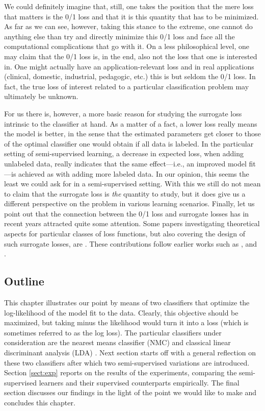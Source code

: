 \documentclass[twoside]{memoir}\usepackage[]{graphicx}\usepackage{xcolor}
\renewcommand{\cite}{\citep}
\begin{document}
We could definitely imagine that, still, one takes the position that the mere loss that matters is the 0/1 loss and that it is this quantity that has to be minimized.  As far as we can see, however, taking this stance to the extreme, one cannot do anything else than try and directly minimize this 0/1 loss and face all the computational complications that go with it.  On a less philosophical level, one may claim that the 0/1 loss is, in the end, also not the loss that one is interested in.  One might actually have an application-relevant loss and in real applications (clinical, domestic, industrial, pedagogic, etc.) this is but seldom the 0/1 loss.  In fact, the true loss of interest related to a particular classification problem may ultimately be unknown.

For us there is, however, a more basic reason for studying the surrogate loss intrinsic to the classifier at hand. As a matter of a fact, a lower loss really means the model is better, in the sense that the estimated parameters get closer to those of the optimal classifier one would obtain if all data is labeled.  In the particular setting of semi-supervised learning, a decrease in expected loss, when adding unlabeled data, really indicates that the same effect---i.e., an improved model fit---is achieved as with adding more labeled data.  In our opinion, this seems the least we could ask for in a semi-supervised setting.  With this we still do not mean to claim that the surrogate loss is \emph{the} quantity to study, but it does give us a different perspective on the problem in various learning scenarios.  Finally, let us point out that the connection between the 0/1 loss and surrogate losses has in recent years attracted quite some attention.  Some papers investigating theoretical aspects for particular classes of loss functions, but also covering the design of such surrogate losses, are \cite{Ben-David2012,masnadi2008design,Nguyen2009,Reid2009,reid2010composite,scott2011surrogate}. These contributions follow earlier works such as \cite{Bartlett2006}, and \cite{Zhang2004}.




\subsection{Outline}

This chapter illustrates our point by means of two classifiers that optimize the log-likelihood of the model fit to the data. Clearly, this objective should be maximized, but taking minus the likelihood would turn it into a loss (which is sometimes referred to as the log loss).  The particular classifiers under consideration are the nearest means classifier (NMC) \cite{duda72a} and classical linear discriminant analysis (LDA) \cite{rao1948utilization}.    Next section starts off with a general reflection on these two classifiers after which two semi-supervised variations are introduced.  Section \ref{sect:exp} reports on the results of the experiments, comparing the semi-supervised learners and their supervised counterparts empirically.  The final section discusses our findings in the light of the point we would like to make and concludes this chapter.
\end{document}
